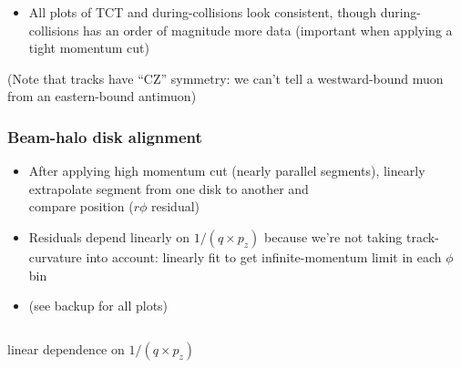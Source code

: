 \documentclass[compress]{beamer}
\begin{document}
\begin{frame}
\begin{itemize}
\item All plots of TCT and during-collisions look consistent, though
  during-collisions has an order of magnitude more data (important
  when applying a tight momentum cut)
\end{itemize}

(Note that tracks have ``CZ'' symmetry: we can't tell a westward-bound
muon from an eastern-bound antimuon)
\end{frame}

\begin{frame}
\frametitle{Beam-halo disk alignment}

\begin{itemize}
\item After applying high momentum cut (nearly parallel segments),
  linearly extrapolate segment from one disk to another and \\ compare
  position ($r\phi$ residual)

\item Residuals depend linearly on $1/(q\times p_z)$ because we're not
  taking track-curvature into account: linearly fit to get
  infinite-momentum limit in each $\phi$ bin

\item {}

(see backup for all plots)
\end{itemize}

\vfill
\begin{columns}
\centering linear dependence on $1/(q\times p_z)$


\end{columns}
\end{frame}
\end{document}
